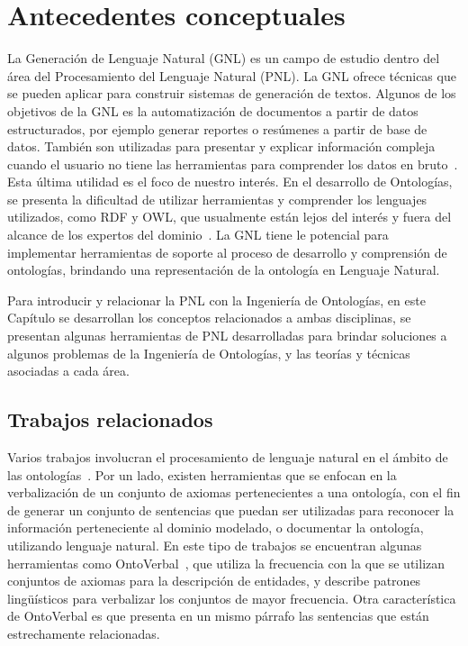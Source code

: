 \chapter{Antecedentes conceptuales}

La Generación de Lenguaje Natural (GNL) es un campo de estudio dentro del área del Procesamiento del Lenguaje Natural (PNL). La GNL ofrece técnicas que se pueden aplicar para construir sistemas de generación de textos. Algunos de los objetivos de la GNL es la automatización de documentos a partir de datos estructurados, por ejemplo generar reportes o resúmenes a partir de base de datos. También son utilizadas para presentar y explicar información compleja cuando el usuario no tiene las herramientas para comprender los datos en bruto~\cite{bernardos2003marco}. Esta última utilidad es el foco de nuestro interés. En el desarrollo de Ontologías, se presenta la dificultad de utilizar herramientas y comprender los lenguajes utilizados, como RDF y OWL, que usualmente están lejos del interés y fuera del alcance de los expertos del dominio~\cite{amaolo2011algunas}. La GNL tiene le potencial para implementar herramientas de soporte al proceso de desarrollo y comprensión de ontologías, brindando una representación de la ontología en Lenguaje Natural.

Para introducir y relacionar la PNL con la Ingeniería de Ontologías, en este Capítulo se desarrollan los conceptos relacionados a ambas disciplinas, se presentan algunas herramientas de PNL desarrolladas para brindar soluciones a algunos problemas de la Ingeniería de Ontologías, y las teorías y técnicas asociadas a cada área. 

\section{Trabajos relacionados}
\label{sec:trabajos_rel}
Varios trabajos involucran el procesamiento de lenguaje natural en el ámbito de las ontologías~\cite{moreno2018ontologia}\cite{perez2002explotacion}\cite{vallez2009web}. Por un lado, existen herramientas que se enfocan en la verbalización de un conjunto de axiomas pertenecientes a una ontología, con el fin de generar un conjunto de sentencias que puedan ser utilizadas para reconocer la información perteneciente al dominio modelado, o documentar la ontología, utilizando lenguaje natural. En este tipo de trabajos se encuentran algunas herramientas como OntoVerbal~\cite{liang2013ontoverbal}, que utiliza la frecuencia con la que se utilizan conjuntos de axiomas para la descripción de entidades, y describe patrones lingüísticos para verbalizar los conjuntos de mayor frecuencia. Otra característica de OntoVerbal es que presenta en un mismo párrafo las sentencias que están estrechamente relacionadas. %


